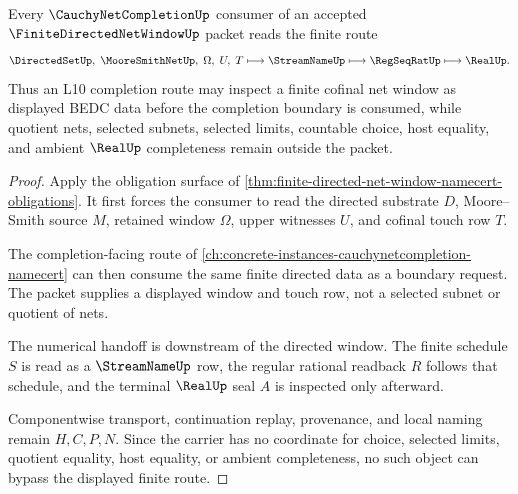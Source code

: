 \begin{theorem}\label{thm:finite-directed-net-window-completion-handoff}
Every $\CauchyNetCompletionUp$ consumer of an accepted $\FiniteDirectedNetWindowUp$ packet reads the finite route
$$
\DirectedSetUp,\;\MooreSmithNetUp,\;\Omega,\;U,\;T \longmapsto \StreamNameUp \longmapsto \RegSeqRatUp \longmapsto \RealUp .
$$
Thus an L10 completion route may inspect a finite cofinal net window as displayed BEDC data before the completion boundary is consumed, while quotient nets, selected subnets, selected limits, countable choice, host equality, and ambient $\RealUp$ completeness remain outside the packet.
\end{theorem}
\begin{proof}
Apply the obligation surface of \autoref{thm:finite-directed-net-window-namecert-obligations}. It first forces the consumer to read the directed substrate $D$, Moore--Smith source $M$, retained window $\Omega$, upper witnesses $U$, and cofinal touch row $T$.

The completion-facing route of \autoref{ch:concrete-instances-cauchynetcompletion-namecert} can then consume the same finite directed data as a boundary request. The packet supplies a displayed window and touch row, not a selected subnet or quotient of nets.

The numerical handoff is downstream of the directed window. The finite schedule $S$ is read as a $\StreamNameUp$ row, the regular rational readback $R$ follows that schedule, and the terminal $\RealUp$ seal $A$ is inspected only afterward.

Componentwise transport, continuation replay, provenance, and local naming remain $H,C,P,N$. Since the carrier has no coordinate for choice, selected limits, quotient equality, host equality, or ambient completeness, no such object can bypass the displayed finite route.
\end{proof}




